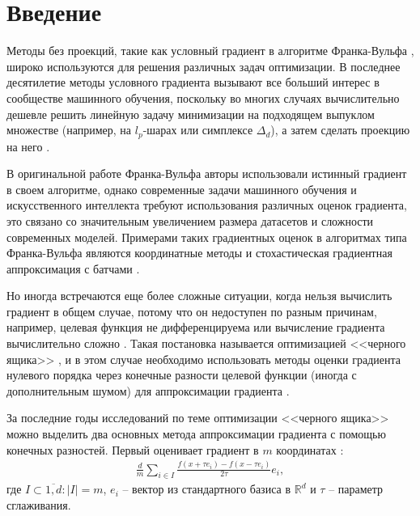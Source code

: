 \section{Введение}

    Методы без проекций, такие как условный градиент в алгоритме Франка-Вульфа \cite{frank1956algorithm}, широко используются для решения различных задач оптимизации. В последнее десятилетие методы условного градиента вызывают все больший интерес в сообществе машинного обучения, поскольку во многих случаях вычислительно дешевле решить линейную задачу минимизации на подходящем выпуклом множестве (например, на $l_p$-шарах или симплексе $\Delta_d$), а затем сделать проекцию на него \cite{leblanc1985improved, jaggi2011sparse, bubeck2015convex, hazan2016introduction, goldfarb2017linear, dadras2022federated, freund2017extended}.
    
    В оригинальной работе Франка-Вульфа \cite{frank1956algorithm} авторы использовали истинный градиент в своем алгоритме, однако современные задачи машинного обучения и искусственного интеллекта требуют использования различных оценок градиента, это связано со значительным увеличением размера датасетов и сложности современных моделей. Примерами таких градиентных оценок в алгоритмах типа Франка-Вульфа являются координатные методы \cite{lacoste2013block, wang2016parallel, osokin2016minding} и стохастическая градиентная аппроксимация с батчами \cite{reddi2016stochastic, zhang2020one, lu2021generalized}.

    Но иногда встречаются еще более сложные ситуации, когда нельзя вычислить градиент в общем случае, потому что он недоступен по разным причинам, например, целевая функция не дифференцируема или вычисление градиента вычислительно сложно \cite{taskar2005learning, chen2017zoo, nesterov2017random, choromanski2018structured, fazel2018global}. Такая постановка называется оптимизацией <<черного ящика>> \cite{lian2015asynchronous}, и в этом случае необходимо использовать методы оценки градиента нулевого порядка через конечные разности целевой функции (иногда с дополнительным шумом) для аппроксимации градиента \cite{doi:10.1137/100802001, duchi2012randomized}. 

    За последние годы исследований по теме оптимизации <<черного ящика>> можно выделить два основных метода аппроксимации градиента с помощью конечных разностей. Первый оценивает градиент в $m$ координатах \cite{richtarik2014iteration, wright2015coordinate, doi:10.1137/16M1060182}:
    \begin{align} \label{eq:full_approx}
        \frac{d}{m} \sum_{i \in I} \frac{f(x + \tau e_i) - f(x - \tau e_i)}{2 \tau} e_i,
    \end{align} 
    где $I \subset \overline{1, d} : |I| = m$, $e_i$ -- вектор из стандартного базиса в $\mathbb{R}^d$ и $\tau$ -- параметр сглаживания.
    
